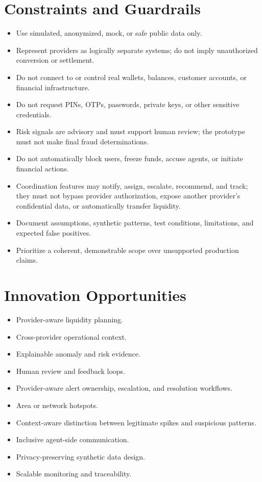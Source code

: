 \documentclass[11pt,a4paper]{article}
\begin{document}
\section{Constraints and Guardrails}
\begin{itemize}[noitemsep]
    \item Use simulated, anonymized, mock, or safe public data only.
    \item Represent providers as logically separate systems; do not imply unauthorized conversion or settlement.
    \item Do not connect to or control real wallets, balances, customer accounts, or financial infrastructure.
    \item Do not request PINs, OTPs, passwords, private keys, or other sensitive credentials.
    \item Risk signals are advisory and must support human review; the prototype must not make final fraud determinations.
    \item Do not automatically block users, freeze funds, accuse agents, or initiate financial actions.
    \item Coordination features may notify, assign, escalate, recommend, and track; they must not bypass provider authorization, expose another provider's confidential data, or automatically transfer liquidity.
    \item Document assumptions, synthetic patterns, test conditions, limitations, and expected false positives.
    \item Prioritize a coherent, demonstrable scope over unsupported production claims.
\end{itemize}

\section{Innovation Opportunities}
\begin{itemize}[noitemsep]
    \item Provider-aware liquidity planning.
    \item Cross-provider operational context.
    \item Explainable anomaly and risk evidence.
    \item Human review and feedback loops.
    \item Provider-aware alert ownership, escalation, and resolution workflows.
    \item Area or network hotspots.
    \item Context-aware distinction between legitimate spikes and suspicious patterns.
    \item Inclusive agent-side communication.
    \item Privacy-preserving synthetic data design.
    \item Scalable monitoring and traceability.
\end{itemize}
\end{document}
